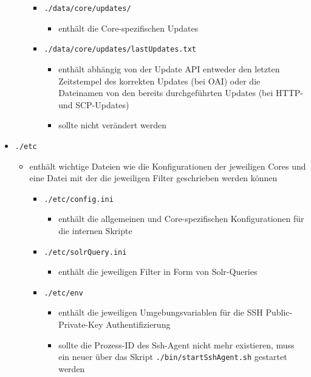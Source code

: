 \documentclass[10pt]{article}
\begin{document}
\begin{itemize}
\begin{itemize}
		\begin{itemize}
			\item[] \texttt{./data/core/updates/}	
			\begin{itemize}
				\item enthält die Core-spezifischen Updates
			\end{itemize}					
		\end{itemize}
		\begin{itemize}
			\item[] \texttt{./data/core/updates/lastUpdates.txt}	
			\begin{itemize}
				\item enthält abhängig von der Update API entweder den letzten Zeitstempel des korrekten Updates (bei OAI) oder die Dateinamen von den bereits durchgeführten Updates (bei HTTP- und SCP-Updates)
				\item sollte nicht verändert werden
			\end{itemize}					
		\end{itemize}
	\end{itemize}

	\item[] \texttt{./etc}
	\begin{itemize}
		\item enthält wichtige Dateien wie die Konfigurationen der jeweiligen Cores und eine Datei mit der die jeweiligen Filter geschrieben werden können
		\begin{itemize}
			\item[] \texttt{./etc/config.ini}
			\begin{itemize}
				\item enthält die allgemeinen und Core-spezifischen Konfigurationen für die internen Skripte
			\end{itemize}
		\end{itemize}
		\begin{itemize}
			\item[] \texttt{./etc/solrQuery.ini}
			\begin{itemize}
				\item enthält die jeweiligen Filter in Form von Solr-Queries
			\end{itemize}
		\end{itemize}
		\begin{itemize}
			\item[] \texttt{./etc/env}
			\begin{itemize}
				\item enthält die jeweiligen Umgebungsvariablen für die SSH Public-Private-Key Authentifizierung
				\item sollte die Prozess-ID des Ssh-Agent nicht mehr existieren, muss ein neuer über das Skript \texttt{./bin/startSshAgent.sh} gestartet werden
			\end{itemize}
		\end{itemize}
	\end{itemize}


\end{itemize}
\end{document}
